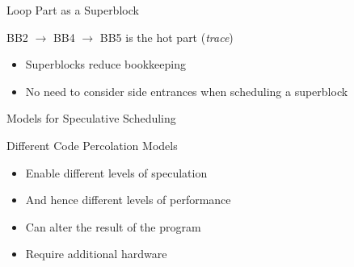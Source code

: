 \documentclass[presentation]{beamer}
\begin{document}
\begin{frame}{Loop Part as a Superblock}
    \begin{minipage}{0.89\textwidth}
        \centering
        \begin{minipage}{0.38\textwidth}
            \centering
            \resizebox{\textwidth}{!}{%
                
            }
            \label{fig:controlflow_side_enterance}
        \end{minipage}\hfill
        \begin{minipage}{0.58\textwidth}
            \centering
            \resizebox{\textwidth}{!}{%
                
            }
            \label{fig:controlflow_superblock}
        \end{minipage}
    \end{minipage}

    \vspace{-0.7cm}
    \begin{minipage}{\textwidth}
        \centering
    \end{minipage}

    \begin{minipage}{\textwidth}
        \begin{block}{BB2 $\rightarrow$ BB4 $\rightarrow$ BB5 is the hot part (\textit{trace})}
            \begin{itemize}
                \item Superblocks reduce bookkeeping~\cite{sb_art}
                \item No need to consider side entrances when scheduling a superblock
            \end{itemize}
        \end{block}
    \end{minipage}
\end{frame}


\begin{frame}{Models for Speculative Scheduling}
    \begin{block}{Different Code Percolation Models}
        \begin{itemize}
            \item Enable different levels of speculation
            \item And hence different levels of performance
            \item Can alter the result of the program
            \item Require additional hardware
        \end{itemize}
    \end{block}
    \vspace{0.9cm}
        
\end{frame}
\end{document}
